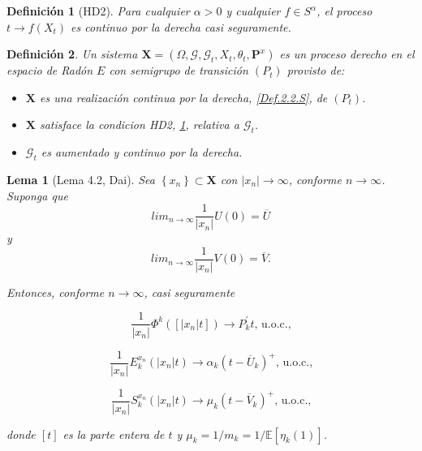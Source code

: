 \documentclass{article}
\newtheorem{Def}{Definición}[section]
\newtheorem{Lema}{Lema}[section]
\newcommand{\esp}{\mathbb{E}}
\newcommand{\SG}{\left(P_{t}\right)}
\newcommand{\CM}{\mathbf{P}^{x}}
\numberwithin{equation}{section}
\begin{document}
\begin{Def}[HD2]\label{Eq.2.2.S}
Para cualquier $\alpha>0$ y cualquier $f\in S^{\alpha}$, el
proceso $t\rightarrow f\left(X_{t}\right)$ es continuo por la
derecha casi seguramente.
\end{Def}

\begin{Def}\label{Def.PD}
Un sistema
$\mathbf{X}=\left(\Omega,\mathcal{G},\mathcal{G}_{t},X_{t},\theta_{t},\CM\right)$
es un proceso derecho en el espacio de Rad\'on $E$ con semigrupo
de transici\'on $\SG$ provisto de:
\begin{itemize}
\item[i)] $\mathbf{X}$ es una realizaci\'on  continua por la
derecha, \ref{Def.2.2.S}, de $\SG$.

\item[ii)] $\mathbf{X}$ satisface la condicion HD2,
\ref{Eq.2.2.S}, relativa a $\mathcal{G}_{t}$.

\item[iii)] $\mathcal{G}_{t}$ es aumentado y continuo por la
derecha.
\end{itemize}
\end{Def}

\begin{Lema}[Lema 4.2, Dai\cite{Dai}]\label{Lema4.2}
Sea $\left\{x_{n}\right\}\subset \mathbf{X}$ con
$|x_{n}|\rightarrow\infty$, conforme $n\rightarrow\infty$. Suponga
que
\[lim_{n\rightarrow\infty}\frac{1}{|x_{n}|}U\left(0\right)=\overline{U}\]
y
\[lim_{n\rightarrow\infty}\frac{1}{|x_{n}|}V\left(0\right)=\overline{V}.\]

Entonces, conforme $n\rightarrow\infty$, casi seguramente

\begin{equation}\label{E1.4.2}
\frac{1}{|x_{n}|}\Phi^{k}\left(\left[|x_{n}|t\right]\right)\rightarrow
P_{k}^{'}t\textrm{, u.o.c.,}
\end{equation}

\begin{equation}\label{E1.4.3}
\frac{1}{|x_{n}|}E^{x_{n}}_{k}\left(|x_{n}|t\right)\rightarrow
\alpha_{k}\left(t-\overline{U}_{k}\right)^{+}\textrm{, u.o.c.,}
\end{equation}

\begin{equation}\label{E1.4.4}
\frac{1}{|x_{n}|}S^{x_{n}}_{k}\left(|x_{n}|t\right)\rightarrow
\mu_{k}\left(t-\overline{V}_{k}\right)^{+}\textrm{, u.o.c.,}
\end{equation}

donde $\left[t\right]$ es la parte entera de $t$ y
$\mu_{k}=1/m_{k}=1/\esp\left[\eta_{k}\left(1\right)\right]$.
\end{Lema}
\end{document}
